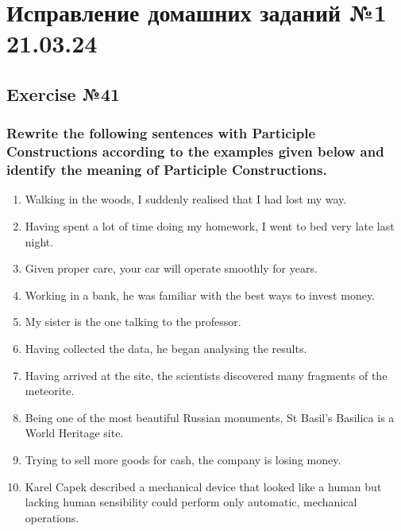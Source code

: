 \chapter{Исправление домашних заданий №1 21.03.24}

\section{Exercise №41}
\subsection*{Rewrite the following sentences with Participle Constructions according
      to the examples given below and identify the meaning of Participle Constructions.}
\begin{enumerate}
      \item Walking in the woods, I suddenly realised that I had lost my way.
      \item Having spent a lot of time doing my homework, I went to bed very late last
            night.
      \item Given proper care, your car will operate smoothly for years.
      \item Working in a bank, he was familiar with the best ways to invest money.
      \item My sister is the one talking to the professor.
      \item Having collected the data, he began analysing the results.
      \item Having arrived at the site, the scientists discovered many fragments of the
            meteorite.
      \item Being one of the most beautiful Russian monuments, St Basil’s Basilica is a
            World Heritage site.
      \item Trying to sell more goods for cash, the company is losing money.
      \item Karel Capek described a mechanical device that looked like a human but
            lacking human sensibility could perform only automatic, mechanical
            operations.
\end{enumerate}

